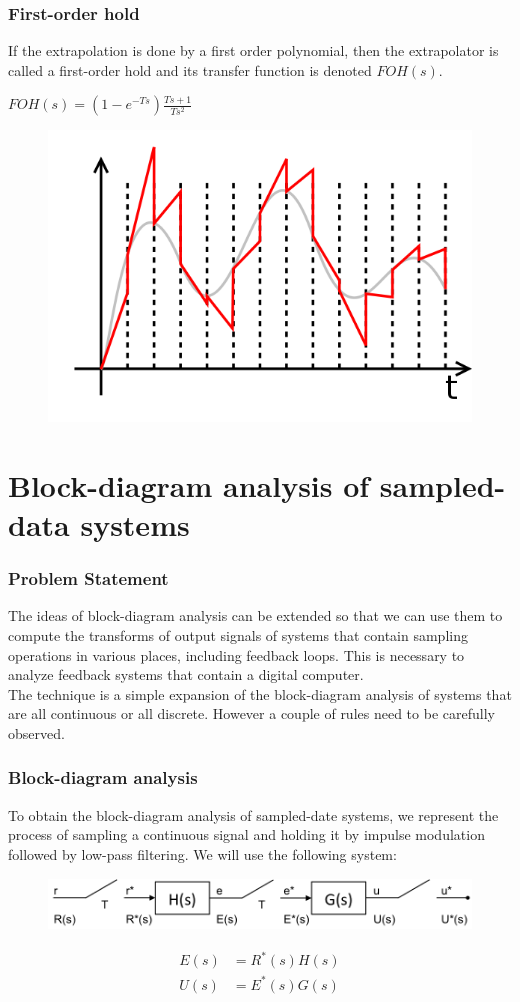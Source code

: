 \begin{frame}
	\frametitle{First-order hold}
	If the extrapolation is done by a first order polynomial, then the extrapolator is called a first-order hold and its transfer function is denoted $FOH(s)$. 
	\begin{center}
		$FOH(s)=(1-e^{-Ts})\frac{Ts+1}{Ts^2}$
	\end{center}
	\vspace{-0.5em}
	\begin{figure}
		\includegraphics[width=0.5\linewidth]{foh}
	\end{figure}
\end{frame}

\section{Block-diagram analysis of sampled-data systems}

\begin{frame}
	\frametitle{Problem Statement}
	The ideas of block-diagram analysis can be extended so that we can use them to compute the transforms of output signals of systems that contain sampling operations in various places, including feedback loops. This is necessary to analyze feedback systems that contain a digital computer.\\
	\vspace{1em}
	The technique is a simple expansion of the block-diagram analysis of systems that are all continuous or all discrete. However a couple of rules need to be carefully observed. 
\end{frame}

\begin{frame}
	\frametitle{Block-diagram analysis}
	To obtain the block-diagram analysis of sampled-date systems, we represent the process of sampling a continuous signal and holding it by impulse modulation followed by low-pass filtering. We will use the following system: 
	\vspace{1em}
	\begin{figure}
		\centering
		\includegraphics[width=1\linewidth]{block_analysis_1}
	\end{figure}
	\vspace{1em}
	\begin{equation}
		\begin{split}
		E(s) &= R^{*}(s)H(s)\\
		U(s) &= E^{*}(s)G(s)
		\end{split}
	\end{equation}
\end{frame}

